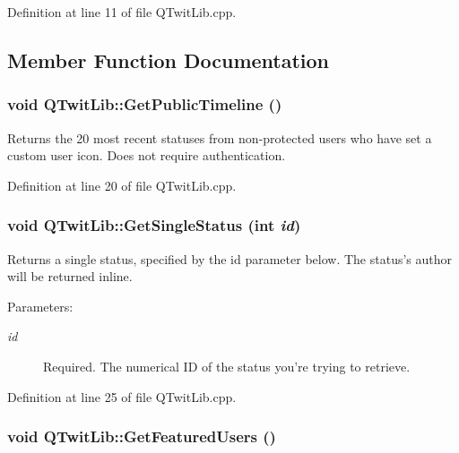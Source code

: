 Definition at line 11 of file QTwitLib.cpp.

\subsection{Member Function Documentation}
\hypertarget{classQTwitLib_af025ecfc615510eacb42b7522c266a9}{
\subsubsection{\setlength{\rightskip}{0pt plus 5cm}void QTwitLib::GetPublicTimeline ()}}
\label{classQTwitLib_af025ecfc615510eacb42b7522c266a9}


Returns the 20 most recent statuses from non-protected users who have set a custom user icon. Does not require authentication. 

Definition at line 20 of file QTwitLib.cpp.\hypertarget{classQTwitLib_892fc8f5a0c0198e6d80b12bfb28e4b1}{
\subsubsection{\setlength{\rightskip}{0pt plus 5cm}void QTwitLib::GetSingleStatus (int {\em id})}}
\label{classQTwitLib_892fc8f5a0c0198e6d80b12bfb28e4b1}


Returns a single status, specified by the id parameter below. The status's author will be returned inline. \begin{Desc}
\item[Parameters:]
\begin{description}
\item[{\em id}]Required. The numerical ID of the status you're trying to retrieve. \end{description}
\end{Desc}


Definition at line 25 of file QTwitLib.cpp.\hypertarget{classQTwitLib_cb2283600d80a9b733dda9307b8400e4}{
\subsubsection{\setlength{\rightskip}{0pt plus 5cm}void QTwitLib::GetFeaturedUsers ()}}
\label{classQTwitLib_cb2283600d80a9b733dda9307b8400e4}



